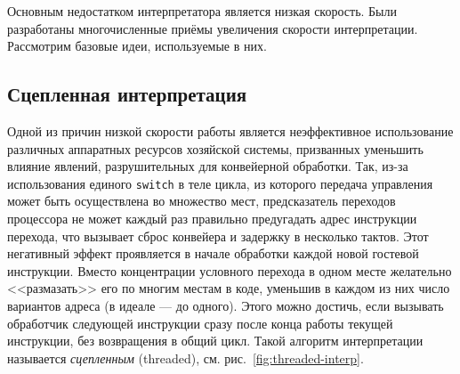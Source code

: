 Основным недостатком интерпретатора является низкая скорость. Были разработаны многочисленные приёмы увеличения скорости интерпретации. Рассмотрим базовые идеи, используемые в них.

\subsection{Сцепленная интерпретация}

Одной из причин низкой скорости работы является неэффективное использование различных аппаратных ресурсов хозяйской системы, призванных уменьшить влияние явлений, разрушительных для конвейерной обработки. Так, из-за использования единого \texttt{switch} в теле цикла, из которого передача управления может быть осуществлена  во множество мест, предсказатель переходов процессора не может каждый раз правильно предугадать адрес инструкции перехода, что вызывает сброс конвейера и задержку в несколько тактов. Этот негативный эффект проявляется в начале обработки каждой новой гостевой инструкции. Вместо концентрации условного перехода в одном месте  желательно <<размазать>> его по многим местам в коде, уменьшив в каждом из них число вариантов адреса (в идеале --- до одного). Этого можно достичь, если вызывать обработчик следующей инструкции сразу после конца работы текущей инструкции, без возвращения в общий цикл. Такой алгоритм интерпретации называется \textit{сцепленным} (\abbr threaded), см. рис.~\ref{fig:threaded-interp}. 

